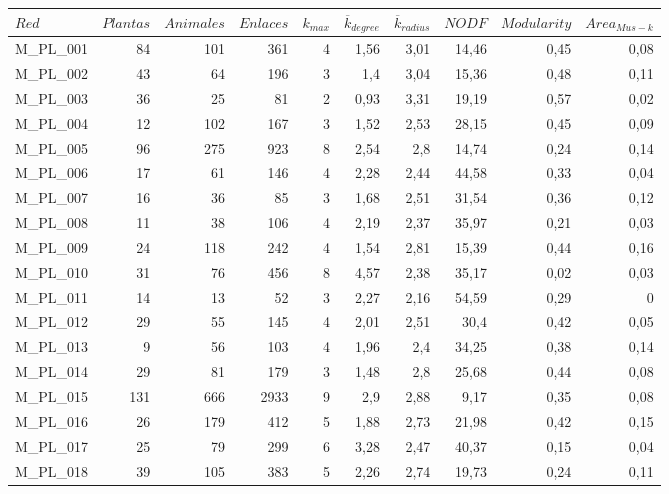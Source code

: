 \begin{table}[htbp]
\tiny
  \centering
    \begin{tabular}{lrrrrrrrrr}
    \toprule
    $Red$  & $Plantas$ & $Animales$ & $Enlaces$ & $k_{max}$ & $\overline k_{degree}$ & $\overline k_{radius}$ & $NODF$ & $Modularity$ & $Area_{Mus-k}$ \\
    \midrule
 
    M\_PL\_001 & 84   & 101  & 361  & 4    & 1,56 & 3,01 & 14,46 & 0,45 & 0,08 \\
    M\_PL\_002 & 43   & 64   & 196  & 3    & 1,4  & 3,04 & 15,36 & 0,48 & 0,11 \\
    M\_PL\_003 & 36   & 25   & 81   & 2    & 0,93 & 3,31 & 19,19 & 0,57 & 0,02 \\
    M\_PL\_004 & 12   & 102  & 167  & 3    & 1,52 & 2,53 & 28,15 & 0,45 & 0,09 \\
    M\_PL\_005 & 96   & 275  & 923  & 8    & 2,54 & 2,8  & 14,74 & 0,24 & 0,14 \\
    M\_PL\_006 & 17   & 61   & 146  & 4    & 2,28 & 2,44 & 44,58 & 0,33 & 0,04 \\
    M\_PL\_007 & 16   & 36   & 85   & 3    & 1,68 & 2,51 & 31,54 & 0,36 & 0,12 \\
    M\_PL\_008 & 11   & 38   & 106  & 4    & 2,19 & 2,37 & 35,97 & 0,21 & 0,03 \\
    M\_PL\_009 & 24   & 118  & 242  & 4    & 1,54 & 2,81 & 15,39 & 0,44 & 0,16 \\
    M\_PL\_010 & 31   & 76   & 456  & 8    & 4,57 & 2,38 & 35,17 & 0,02 & 0,03 \\
    M\_PL\_011 & 14   & 13   & 52   & 3    & 2,27 & 2,16 & 54,59 & 0,29 & 0 \\
    M\_PL\_012 & 29   & 55   & 145  & 4    & 2,01 & 2,51 & 30,4 & 0,42 & 0,05 \\
    M\_PL\_013 & 9    & 56   & 103  & 4    & 1,96 & 2,4  & 34,25 & 0,38 & 0,14 \\
    M\_PL\_014 & 29   & 81   & 179  & 3    & 1,48 & 2,8  & 25,68 & 0,44 & 0,08 \\
    M\_PL\_015 & 131  & 666  & 2933 & 9    & 2,9  & 2,88 & 9,17 & 0,35 & 0,08 \\
    M\_PL\_016 & 26   & 179  & 412  & 5    & 1,88 & 2,73 & 21,98 & 0,42 & 0,15 \\
    M\_PL\_017 & 25   & 79   & 299  & 6    & 3,28 & 2,47 & 40,37 & 0,15 & 0,04 \\
    M\_PL\_018 & 39   & 105  & 383  & 5    & 2,26 & 2,74 & 19,73 & 0,24 & 0,11 \\

\end{tabular}
\end{table}
